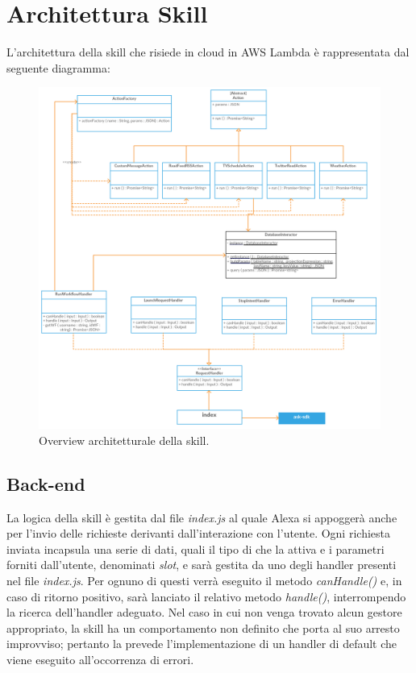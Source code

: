 \pagebreak
\section{Architettura Skill}

L'architettura della skill che risiede in cloud in AWS Lambda è rappresentata dal seguente diagramma:

\begin{figure}[H]
	\begin{center}
		\includegraphics[width=\textwidth, keepaspectratio]{../includes/pics/Skill.png}
		\caption{Overview architetturale della skill.}
	\end{center}
\end{figure}

\subsection{Back-end}
La logica della skill è gestita dal file \emph{index.js} al quale Alexa si appoggerà anche per l'invio delle richieste derivanti dall'interazione con l'utente.
Ogni richiesta inviata incapsula una serie di dati, quali il tipo di  che la attiva e i parametri forniti dall'utente, denominati \emph{slot}, e sarà gestita da uno degli handler presenti nel file \emph{index.js}.
Per ognuno di questi verrà eseguito il metodo \textit{canHandle()} e, in caso di ritorno positivo, sarà lanciato il relativo metodo \textit{handle()}, interrompendo la ricerca dell'handler adeguato.
Nel caso in cui non venga trovato alcun gestore appropriato, la skill ha un comportamento non definito che porta al suo arresto improvviso; pertanto la  prevede l'implementazione di un handler di default che viene eseguito all'occorrenza di errori.

